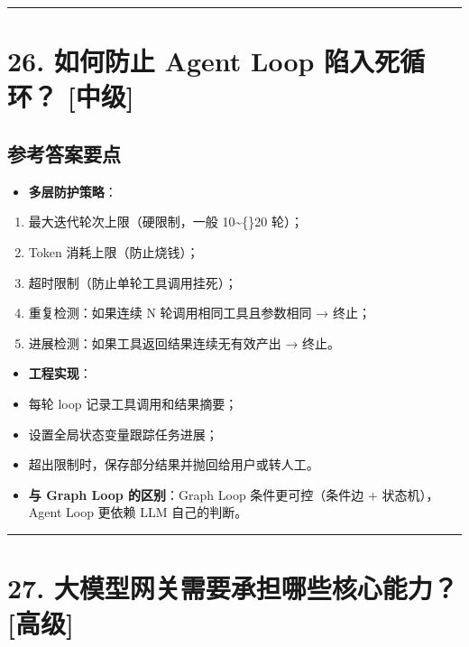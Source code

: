 \documentclass[9pt,a4paper,twocolumn]{ctexart}
\newcommand{\lvzhong}{\usebox{\badgezhongbox}}
\newcommand{\lvgao}{\usebox{\badgegaobox}}
\def\lvzhong{[中级]}%
\def\lvgao{[高级]}%
\begin{document}
\vspace{2pt}
\noindent\rule{\columnwidth}{0.3pt}\vspace{2pt}



\section*{26. 如何防止 Agent Loop 陷入死循环？ \lvzhong{}}


\subsection*{参考答案要点}

\begin{itemize}[itemsep=1pt, topsep=2pt]
  \item \textbf{多层防护策略}：
\end{itemize}
\begin{enumerate}[itemsep=1pt, topsep=2pt]
  \item 最大迭代轮次上限（硬限制，一般 10\textasciitilde\{\}20 轮）；
  \item Token 消耗上限（防止烧钱）；
  \item 超时限制（防止单轮工具调用挂死）；
  \item 重复检测：如果连续 N 轮调用相同工具且参数相同 → 终止；
  \item 进展检测：如果工具返回结果连续无有效产出 → 终止。
\end{enumerate}
\begin{itemize}[itemsep=1pt, topsep=2pt]
  \item \textbf{工程实现}：
  \item 每轮 loop 记录工具调用和结果摘要；
  \item 设置全局状态变量跟踪任务进展；
  \item 超出限制时，保存部分结果并抛回给用户或转人工。
  \item \textbf{与 Graph Loop 的区别}：Graph Loop 条件更可控（条件边 + 状态机），Agent Loop 更依赖 LLM 自己的判断。
\end{itemize}


\vspace{2pt}
\noindent\rule{\columnwidth}{0.3pt}\vspace{2pt}



\section*{27. 大模型网关需要承担哪些核心能力？ \lvgao{}}
\end{document}
